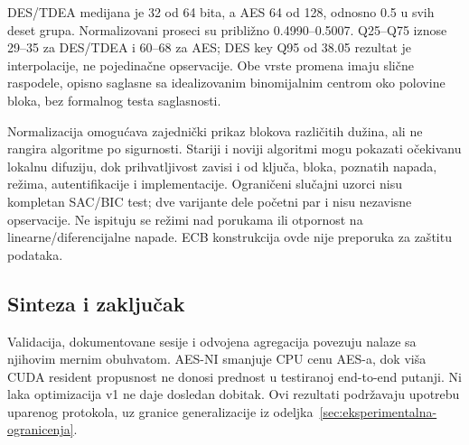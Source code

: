 DES/TDEA medijana je 32 od 64 bita, a AES 64 od 128, odnosno 0.5 u
svih deset grupa. Normalizovani proseci su približno 0.4990--0.5007.
Q25--Q75 iznose 29--35 za DES/TDEA i 60--68 za AES; DES key Q95 od
38.05 rezultat je interpolacije, ne pojedinačne opservacije. Obe vrste
promena imaju slične raspodele, opisno saglasne sa idealizovanim
binomijalnim centrom oko polovine bloka, bez formalnog testa saglasnosti.

Normalizacija omogućava zajednički prikaz blokova različitih dužina,
ali ne rangira algoritme po sigurnosti. Stariji i noviji algoritmi
mogu pokazati očekivanu lokalnu difuziju, dok prihvatljivost zavisi i od
ključa, bloka, poznatih napada, režima, autentifikacije i implementacije.
Ograničeni slučajni uzorci nisu kompletan SAC/BIC test; dve varijante
dele početni par i nisu nezavisne opservacije. Ne ispituju se režimi
nad porukama ili otpornost na linearne/diferencijalne napade. ECB
konstrukcija ovde nije preporuka za zaštitu podataka.

\subsection{Sinteza i zaključak}
Validacija, dokumentovane sesije i odvojena agregacija povezuju nalaze
sa njihovim mernim obuhvatom. AES-NI smanjuje CPU cenu AES-a, dok viša
CUDA resident propusnost ne donosi prednost u testiranoj end-to-end
putanji. Ni laka optimizacija v1 ne daje dosledan dobitak. Ovi rezultati
podržavaju upotrebu uparenog protokola, uz granice generalizacije iz
odeljka~\ref{sec:eksperimentalna-ogranicenja}.

